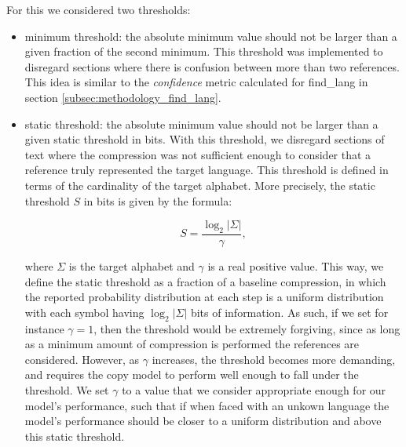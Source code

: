 \documentclass{article}
\begin{document}
For this we considered two thresholds:
\begin{itemize}
    \item minimum threshold: the absolute minimum value should not be larger than a given fraction of the second minimum. This threshold was implemented to disregard sections where there is confusion between more than two references. This idea is similar to the \textit{confidence} metric calculated for find_lang in section \ref{subsec:methodology_find_lang}.
    \item static threshold: the absolute minimum value should not be larger than a given static threshold in bits. With this threshold, we disregard sections of text where the compression was not sufficient enough to consider that a reference truly represented the target language.
    This threshold is defined in terms of the cardinality of the target alphabet.
    More precisely, the static threshold $S$ in bits is given by the formula:

    \begin{equation}
        \label{eq:locate_lang_static_threshold}
        S = \frac{\log_2 |\Sigma|}{\gamma},
    \end{equation}

    where $\Sigma$ is the target alphabet and $\gamma$ is a real positive value.
    This way, we define the static threshold as a fraction of a baseline compression, in which the reported probability distribution at each step is a uniform distribution with each symbol having $\log_2 |\Sigma|$ bits of information.
    As such, if we set for instance $\gamma = 1$, then the threshold would be extremely forgiving, since as long as a minimum amount of compression is performed the references are considered.
    However, as $\gamma$ increases, the threshold becomes more demanding, and requires the copy model to perform well enough to fall under the threshold.
    We set $\gamma$ to a value that we consider appropriate enough for our model's performance, such that if when faced with an unkown language the model's performance should be closer to a uniform distribution and above this static threshold.
\end{itemize}
\end{document}
